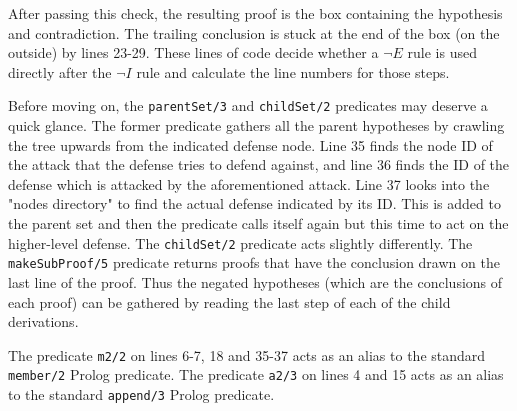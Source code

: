 \documentclass[11pt,twoside,a4paper]{report}
\begin{document}
After passing this check, the resulting proof is the box containing the hypothesis and contradiction. The trailing conclusion is stuck at the end of the box (on the outside) by lines 23-29. These lines of code decide whether a $\neg E$ rule is used directly after the $\neg I$ rule and calculate the line numbers for those steps.

Before moving on, the \lstinline$parentSet/3$ and \lstinline$childSet/2$ predicates may deserve a quick glance. The former predicate gathers all the parent hypotheses by crawling the tree upwards from the indicated defense node. Line 35 finds the node ID of the attack that the defense tries to defend against, and line 36 finds the ID of the defense which is attacked by the aforementioned attack. Line 37 looks into the "nodes directory" to find the actual defense indicated by its ID. This is added to the parent set and then the predicate calls itself again but this time to act on the higher-level defense. The \lstinline$childSet/2$ predicate acts slightly differently. The \lstinline$makeSubProof/5$ predicate returns proofs that have the conclusion drawn on the last line of the proof. Thus the negated hypotheses (which are the conclusions of each proof) can be gathered by reading the last step of each of the child derivations.

The predicate \lstinline$m2/2$ on lines 6-7, 18 and 35-37 acts as an alias to the standard \lstinline$member/2$ Prolog predicate. The predicate \lstinline$a2/3$ on lines 4 and 15 acts as an alias to the standard \lstinline$append/3$ Prolog predicate.
\end{document}
